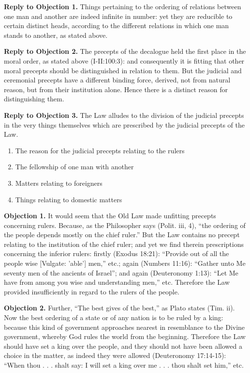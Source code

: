 \textbf{Reply to Objection 1.} Things pertaining to the ordering of relations between one man and another are indeed infinite in number: yet they are reducible to certain distinct heads, according to the different relations in which one man stands to another, as stated above.

\textbf{Reply to Objection 2.} The precepts of the decalogue held the first place in the moral order, as stated above (I-II:100:3): and consequently it is fitting that other moral precepts should be distinguished in relation to them. But the judicial and ceremonial precepts have a different binding force, derived, not from natural reason, but from their institution alone. Hence there is a distinct reason for distinguishing them.

\textbf{Reply to Objection 3.} The Law alludes to the division of the judicial precepts in the very things themselves which are prescribed by the judicial precepts of the Law.


\begin{enumerate}

\item  The reason for the judicial precepts relating to the rulers 
\item  The fellowship of one man with another 
\item  Matters relating to foreigners 
\item  Things relating to domestic matters 
\end{enumerate}


\textbf{Objection 1.} It would seem that the Old Law made unfitting precepts concerning rulers. Because, as the Philosopher says (Polit. iii, 4), ``the ordering of the people depends mostly on the chief ruler.'' But the Law contains no precept relating to the institution of the chief ruler; and yet we find therein prescriptions concerning the inferior rulers: firstly (Exodus 18:21): ``Provide out of all the people wise [Vulgate: 'able'] men,'' etc.; again (Numbers 11:16): ``Gather unto Me seventy men of the ancients of Israel''; and again (Deuteronomy 1:13): ``Let Me have from among you wise and understanding men,'' etc. Therefore the Law provided insufficiently in regard to the rulers of the people.

\textbf{Objection 2.} Further, ``The best gives of the best,'' as Plato states (Tim. ii). Now the best ordering of a state or of any nation is to be ruled by a king: because this kind of government approaches nearest in resemblance to the Divine government, whereby God rules the world from the beginning. Therefore the Law should have set a king over the people, and they should not have been allowed a choice in the matter, as indeed they were allowed (Deuteronomy 17:14-15): ``When thou . . . shalt say: I will set a king over me . . . thou shalt set him,'' etc.


